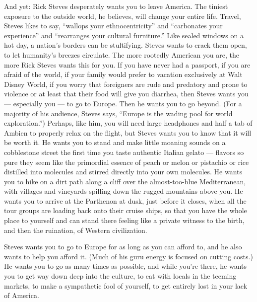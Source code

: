 And yet: Rick Steves desperately wants you to leave America. The tiniest
exposure to the outside world, he believes, will change your entire
life. Travel, Steves likes to say, ``wallops your ethnocentricity'' and
``carbonates your experience'' and ``rearranges your cultural
furniture.'' Like sealed windows on a hot day, a nation's borders can be
stultifying. Steves wants to crack them open, to let humanity's breezes
circulate. The more rootedly American you are, the more Rick Steves
wants this for you. If you have never had a passport, if you are afraid
of the world, if your family would prefer to vacation exclusively at
Walt Disney World, if you worry that foreigners are rude and predatory
and prone to violence or at least that their food will give you
diarrhea, then Steves wants you --- especially you --- to go to Europe.
Then he wants you to go beyond. (For a majority of his audience, Steves
says, ``Europe is the wading pool for world exploration.'') Perhaps,
like him, you will need large headphones and half a tab of Ambien to
properly relax on the flight, but Steves wants you to know that it will
be worth it. He wants you to stand and make little moaning sounds on a
cobblestone street the first time you taste authentic Italian gelato ---
flavors so pure they seem like the primordial essence of peach or melon
or pistachio or rice distilled into molecules and stirred directly into
your own molecules. He wants you to hike on a dirt path along a cliff
over the almost-too-blue Mediterranean, with villages and vineyards
spilling down the rugged mountains above you. He wants you to arrive at
the Parthenon at dusk, just before it closes, when all the tour groups
are loading back onto their cruise ships, so that you have the whole
place to yourself and can stand there feeling like a private witness to
the birth, and then the ruination, of Western civilization.

Steves wants you to go to Europe for as long as you can afford to, and
he also wants to help you afford it. (Much of his guru energy is focused
on cutting costs.) He wants you to go as many times as possible, and
while you're there, he wants you to get way down deep into the culture,
to eat with locals in the teeming markets, to make a sympathetic fool of
yourself, to get entirely lost in your lack of America.


